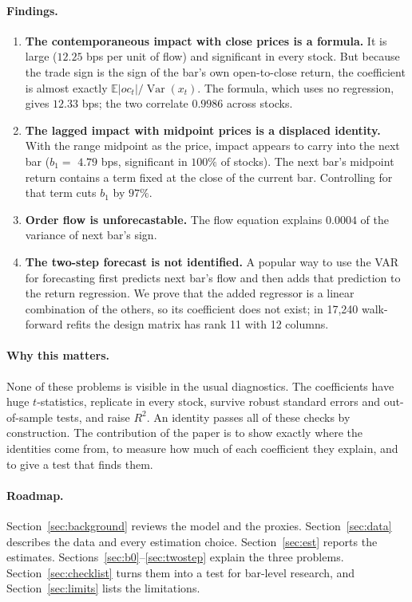 \documentclass[11pt,a4paper]{article}
\newcommand{\E}{\mathbb{E}}
\begin{document}
\paragraph{Findings.}
\begin{enumerate}
\item \textbf{The contemporaneous impact with close prices is a formula.} It is large ($12.25$ bps
per unit of flow) and significant in every stock. But because the trade sign is the sign of the bar's
own open-to-close return, the coefficient is almost exactly
$\E|oc_t|/\operatorname{Var}(x_t)$. The formula, which uses no regression, gives $12.33$ bps; the
two correlate $0.9986$ across stocks.
\item \textbf{The lagged impact with midpoint prices is a displaced identity.} With the range midpoint
as the price, impact appears to carry into the next bar ($b_1=$ $4.79$ bps, significant in
$100\%$ of stocks). The next bar's midpoint return contains a term fixed at the close of the
current bar. Controlling for that term cuts $b_1$ by $97\%$.
\item \textbf{Order flow is unforecastable.} The flow equation explains $0.0004$ of the variance of
next bar's sign.
\item \textbf{The two-step forecast is not identified.} A popular way to use the VAR for forecasting
first predicts next bar's flow and then adds that prediction to the return regression. We prove that
the added regressor is a linear combination of the others, so its coefficient does not exist; in
17{,}240 walk-forward refits the design matrix has rank 11 with 12 columns.
\end{enumerate}

\paragraph{Why this matters.} None of these problems is visible in the usual diagnostics. The
coefficients have huge $t$-statistics, replicate in every stock, survive robust standard errors and
out-of-sample tests, and raise $R^2$. An identity passes all of these checks by construction. The
contribution of the paper is to show exactly where the identities come from, to measure how much of
each coefficient they explain, and to give a test that finds them.

\paragraph{Roadmap.} Section~\ref{sec:background} reviews the model and the proxies. Section~\ref{sec:data}
describes the data and every estimation choice. Section~\ref{sec:est} reports the estimates.
Sections~\ref{sec:b0}--\ref{sec:twostep} explain the three problems. Section~\ref{sec:checklist} turns
them into a test for bar-level research, and Section~\ref{sec:limits} lists the limitations.
\end{document}
